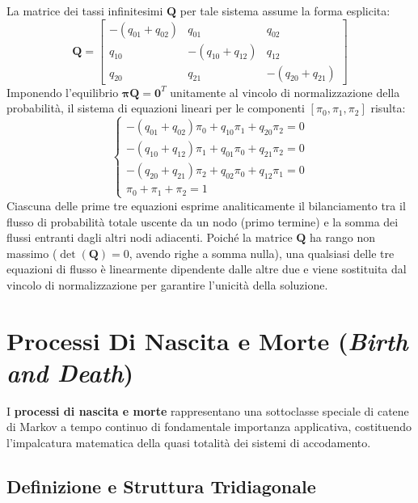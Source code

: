 \documentclass[11pt, a4paper]{article}
\begin{document}
La matrice dei tassi infinitesimi $\bm{Q}$ per tale sistema assume la forma esplicita:
\[
    \bm{Q} = \begin{bmatrix}
        -(q_{01} + q_{02}) & q_{01} & q_{02} \\
        q_{10} & -(q_{10} + q_{12}) & q_{12} \\
        q_{20} & q_{21} & -(q_{20} + q_{21})
    \end{bmatrix}
\]
Imponendo l'equilibrio $\bm{\pi}\bm{Q} = \bm{0}^T$ unitamente al vincolo di normalizzazione della probabilità, il sistema di equazioni lineari per le componenti $[\pi_0, \pi_1, \pi_2]$ risulta:
\begin{equation}
    \begin{cases}
        -(q_{01} + q_{02})\pi_0 + q_{10}\pi_1 + q_{20}\pi_2 = 0 \\
        -(q_{10} + q_{12})\pi_1 + q_{01}\pi_0 + q_{21}\pi_2 = 0 \\
        -(q_{20} + q_{21})\pi_2 + q_{02}\pi_0 + q_{12}\pi_1 = 0 \\
        \pi_0 + \pi_1 + \pi_2 = 1
    \end{cases}
\end{equation}
Ciascuna delle prime tre equazioni esprime analiticamente il bilanciamento tra il flusso di probabilità totale uscente da un nodo (primo termine) e la somma dei flussi entranti dagli altri nodi adiacenti. Poiché la matrice $\bm{Q}$ ha rango non massimo ($\det(\bm{Q}) = 0$, avendo righe a somma nulla), una qualsiasi delle tre equazioni di flusso è linearmente dipendente dalle altre due e viene sostituita dal vincolo di normalizzazione per garantire l'unicità della soluzione.

\newpage


\section{Processi Di Nascita e Morte (\emph{Birth and Death})}

I \textbf{processi di nascita e morte} rappresentano una sottoclasse speciale di catene di Markov a tempo continuo di fondamentale importanza applicativa, costituendo l'impalcatura matematica della quasi totalità dei sistemi di accodamento.

\subsection{Definizione e Struttura Tridiagonale}
\end{document}
